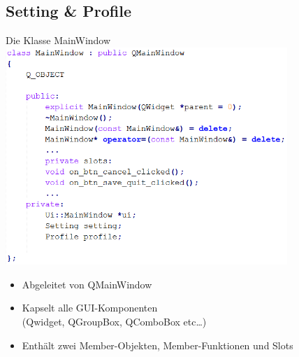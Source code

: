\documentclass{beamer}
\begin{document}
\subsection{Setting \& Profile}
	\begin{frame}
		\centering
			\Large Die Klasse MainWindow\\
		    \vspace{1em}
			\includegraphics[width=0.8\textwidth]{main_window_code.png}\\
	\end{frame}
	
	\begin{frame}
		\centering
		\begin{large}
			\begin{itemize}
				\item 	Abgeleitet von QMainWindow\\
                \vspace{1em}
				\item Kapselt alle GUI-Komponenten \\(Qwidget, QGroupBox, QComboBox etc…)\\
                \vspace{1em}
				\item Enthält zwei Member-Objekten, Member-Funktionen und Slots\\
			\end{itemize}
			
		\end{large}
	\end{frame}
	
\end{document}
